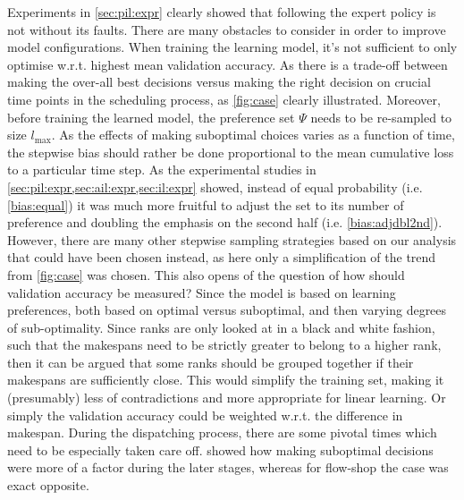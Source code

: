 \documentclass[twocolumn]{svjour3}
\begin{document}
Experiments in \cref{sec:pil:expr} clearly showed that following the expert 
policy is not without its faults. There are many obstacles to consider in order 
to improve model configurations. 
When training the learning model, it's not sufficient to only optimise w.r.t. 
highest mean validation accuracy. As there is a trade-off between making the 
over-all best decisions versus making the right decision on crucial time points 
in the scheduling process, as \cref{fig:case} clearly illustrated. 
Moreover, before training the learned model, the preference set $\Psi$ 
needs to be re-sampled to size $l_{\max}$. 
As the effects of making suboptimal choices varies as a function of time, the 
stepwise bias should rather be done proportional to the mean 
cumulative loss to a particular time step. 
As the experimental studies in \cref{sec:pil:expr,sec:ail:expr,sec:il:expr} 
showed, instead of equal probability (i.e. \ref{bias:equal}) it was much more 
fruitful to adjust the set to its number of preference and doubling the 
emphasis on the second half (i.e. \ref{bias:adjdbl2nd}).
However, there are many other stepwise sampling strategies based on our 
analysis that could have been chosen instead, as here only a 
simplification of the trend from \cref{fig:case} was chosen. 
This also opens of the question of how should validation accuracy be measured? 
Since the model is based on learning preferences, both based on optimal versus 
suboptimal, and then varying degrees of sub-optimality. Since ranks are only 
looked at in a black and white fashion, such that the makespans need to be 
strictly greater to belong to a higher rank, then it can be argued that some 
ranks should be grouped together if their makespans are sufficiently close. 
This would simplify the training set, making it (presumably) less of 
contradictions and more appropriate for linear learning. Or simply the 
validation accuracy could be weighted w.r.t. the difference in makespan.
During the dispatching process, there are some pivotal times which need to be 
especially taken care off.  showed how making suboptimal 
decisions were more of a factor during the later stages, whereas for flow-shop 
the case was exact opposite. 
\end{document}
